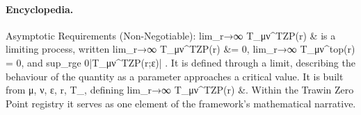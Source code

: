 \paragraph{Encyclopedia.}
Asymptotic Requirements (Non-Negotiable): lim\_r→∞ T\_μν\textasciicircum{}TZP(r) \& is a limiting process, written lim\_r→∞ T\_μν\textasciicircum{}TZP(r) \&= 0, lim\_r→∞ T\_μν\textasciicircum{}top(r) = 0, and sup\_rge 0|T\_μν\textasciicircum{}TZP(r;ε)| . It is defined through a limit, describing the behaviour of the quantity as a parameter approaches a critical value. It is built from μ, ν, ε, r, T\_, defining lim\_r→∞ T\_μν\textasciicircum{}TZP(r) \&. Within the Trawin Zero Point registry it serves as one element of the framework's mathematical narrative.
